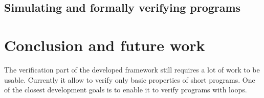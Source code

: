\subsection{Simulating and formally verifying programs}



\section{Conclusion and future work}

The verification part of the developed framework still requires a lot of work to be usable. Currently it allow to verify only basic properties of short programs. One of the closest development goals is to enable it to verify programs with loops.

\printbibliography[
     heading=bibintoc %
    , title=Bibliography %
]


